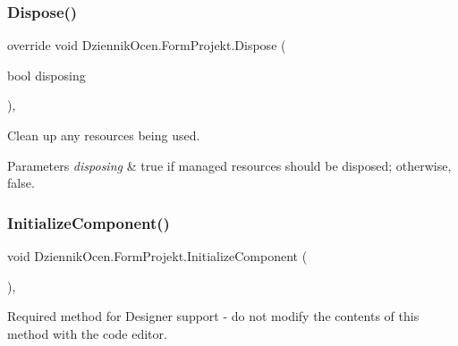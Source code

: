 \mbox{\label{class_dziennik_ocen_1_1_form_projekt_a78ce43373f97d5189228be2bd0a986db}} 
\subsubsection{\texorpdfstring{Dispose()}{Dispose()}}
{\footnotesize\ttfamily override void Dziennik\+Ocen.\+Form\+Projekt.\+Dispose (\begin{DoxyParamCaption}\item[{bool}]{disposing }\end{DoxyParamCaption})\hspace{0.3cm}{\ttfamily [inline]}, {\ttfamily [protected]}}



Clean up any resources being used. 


\begin{DoxyParams}{Parameters}
{\em disposing} & true if managed resources should be disposed; otherwise, false.\\
\hline
\end{DoxyParams}
\mbox{\label{class_dziennik_ocen_1_1_form_projekt_a17fb1a9c33ba3c82ea1f93b9c7dceb7d}} 
\subsubsection{\texorpdfstring{Initialize\+Component()}{InitializeComponent()}}
{\footnotesize\ttfamily void Dziennik\+Ocen.\+Form\+Projekt.\+Initialize\+Component (\begin{DoxyParamCaption}{ }\end{DoxyParamCaption})\hspace{0.3cm}{\ttfamily [inline]}, {\ttfamily [private]}}



Required method for Designer support -\/ do not modify the contents of this method with the code editor. 



